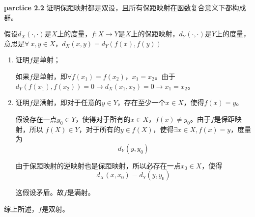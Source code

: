 \begin{mdframed}
    \textbf{parctice 2.2} 证明保距映射都是双设，且所有保距映射在函数复合意义下都构成群。

    假设$d_X(\cdot,\cdot)$是$X$上的度量，$f:X\rightarrow Y$是$X$上的保距映射，$d_{Y}(\cdot,\cdot)$是$Y$上的度量，意思是$\forall\ x,y\in X$，$d_X(x,y)=d_{Y}(f(x),f(y))$
    \begin{enumerate}
        \item 证明$f$是单射；
        
        如果$f$是单射，即$\forall f(x_1)=f(x_2)$，$x_1=x_2$。由于$d_Y(f(x_1),f(x_2))=0\rightarrow d_X(x_1,x_2)=0\rightarrow x_1=x_2$。

        \item 证明$f$是满射，即对于任意的$y\in Y$，存在至少一个$x\in X$，使得$f(x)=y$。

        假设存在一点$y_0\in Y$，使得对于所有的$x\in X$，$f(x)\neq y_0$。由于$f$是保距映射，所以
        $f(X)\in Y$，对于所有的$y\in f(X)$，使得$\exists x\in X,f(x)=y$，度量为
        \begin{equation}
            d_Y(y,y_0)
        \end{equation}

        由于保距映射的逆映射也是保距映射，所以必存在一点$x_0\in X$，使得
        \begin{equation}
            d_X(x,x_0)=d_Y(y,y_0)
        \end{equation}

        这假设矛盾。故$f$是满射。
    \end{enumerate}

    综上所述，$f$是双射。
\end{mdframed}

\newpage


